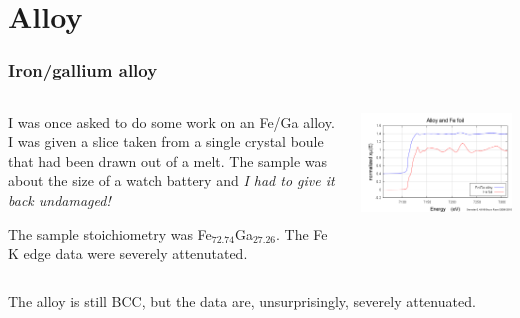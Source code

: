 \documentclass[10pt, xcolor=x11names, compress]{beamer}
\begin{document}
\section{Alloy}
\begin{frame}
  \frametitle{Iron/gallium alloy}
  \begin{columns}
    \begin{column}{0.5\linewidth}
      I was once asked to do some work on an Fe/Ga alloy.  I was given
      a slice taken from a single crystal boule that had been drawn
      out of a melt.  The sample was about the size of a watch battery
      and \textit{I had to give it back undamaged!}

      \medskip

      The sample stoichiometry was Fe$_{72.74}$Ga$_{27.26}$.  The Fe K
      edge data were severely attenutated.
    \end{column}
    \begin{column}{0.5\linewidth}
      \includegraphics[width=\linewidth]{images/alloy_foil.png}
    \end{column}
  \end{columns}

  \bigskip

  The alloy is still BCC, but the data are, unsurprisingly, severely
  attenuated.
\end{frame}
\end{document}

